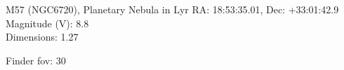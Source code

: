 \begin{block}{M57 (NGC6720), Planetary Nebula in Lyr}
    RA: 18:53:35.01, Dec: +33:01:42.9 \\ 
    Magnitude (V): 8.8 \\ 
    Dimensions: 1.27 

    Finder fov: 30 
\end{block}